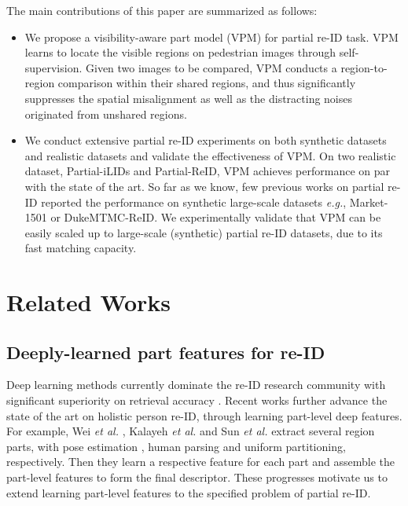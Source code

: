 \documentclass[10pt,twocolumn,letterpaper]{article}
\begin{document}
The main contributions of this paper are summarized as follows:
\begin {itemize}
\item We propose a visibility-aware part model (VPM) for partial re-ID task. VPM learns to locate the visible regions on pedestrian images through self-supervision. Given two images to be compared, VPM conducts a region-to-region comparison within their shared regions, and thus significantly suppresses the spatial misalignment as well as the distracting noises originated from unshared regions. 
\item We conduct extensive partial re-ID experiments on both synthetic datasets and realistic datasets and validate the effectiveness of VPM. On two realistic dataset, Partial-iLIDs and Partial-ReID, VPM achieves performance on par with the state of the art. So far as we know, few previous works on partial re-ID reported the performance on synthetic large-scale datasets \emph{e.g.}, Market-1501 or DukeMTMC-ReID. We experimentally validate that VPM can be easily scaled up to large-scale (synthetic) partial re-ID datasets, due to its fast matching capacity. 
\end {itemize}

\section {Related Works}
\subsection {Deeply-learned part features for re-ID}
Deep learning methods currently dominate the re-ID research community with significant superiority on retrieval accuracy \cite{DBLP:journals/corr/ZhengYH16}. Recent works \cite{PCB_ECCV, cvpr2018:SPReID, Wei2017GLAD, Zhao2017Deeply,Su2017Pose,Yao2017Deep,Liu2017HydraPlus} further advance the state of the art on holistic person re-ID, through learning part-level deep features. For example, Wei \emph{et al.} \cite{Wei2017GLAD}, Kalayeh \emph{et al.} \cite{cvpr2018:SPReID} and Sun \emph {et al.} \cite{PCB_ECCV} extract several region parts, with pose estimation \cite{pose:Long2015Fully,pose:CPM,pose:DeeperCut,pose:hourglass,pose:Cao2016Realtime}, human parsing \cite{parsing:Chen2018DeepLab,parsing:self_supervised_human_parsing} and uniform partitioning, respectively. Then they learn a respective feature for each part and assemble the part-level features to form the final descriptor. These progresses motivate us to extend learning part-level features to the specified problem of partial re-ID. 
\end{document}
